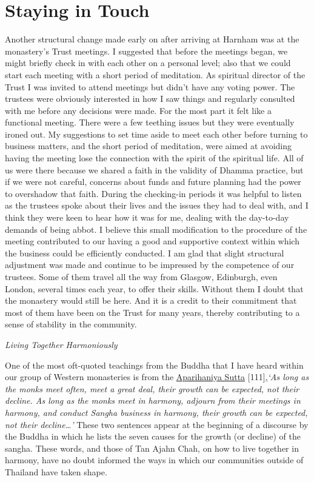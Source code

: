 \chapter{Staying in Touch}

Another structural change made early on after arriving at Harnham was at
the monastery's Trust meetings. I suggested that before the meetings
began, we might briefly check in with each other on a personal level;
also that we could start each meeting with a short period of meditation.
As spiritual director of the Trust I was invited to attend meetings but
didn't have any voting power. The trustees were obviously interested in
how I saw things and regularly consulted with me before any decisions
were made. For the most part it felt like a functional meeting. There
were a few teething issues but they were eventually ironed out. My
suggestions to set time aside to meet each other before turning to
business matters, and the short period of meditation, were aimed at
avoiding having the meeting lose the connection with the spirit of the
spiritual life. All of us were there because we shared a faith in the
validity of Dhamma practice, but if we were not careful, concerns about
funds and future planning had the power to overshadow that faith. During
the checking-in periods it was helpful to listen as the trustees spoke
about their lives and the issues they had to deal with, and I think they
were keen to hear how it was for me, dealing with the day-to-day demands
of being abbot. I believe this small modification to the procedure of
the meeting contributed to our having a good and supportive context
within which the business could be efficiently conducted. I am glad that
slight structural adjustment was made and continue to be impressed by
the competence of our trustees. Some of them travel all the way from
Glasgow, Edinburgh, even London, several times each year, to offer their
skills. Without them I doubt that the monastery would still be here. And
it is a credit to their commitment that most of them have been on the
Trust for many years, thereby contributing to a sense of stability in
the community.

\emph{Living Together Harmoniously}

One of the most oft-quoted teachings from the Buddha that I have heard
within our group of Western monasteries is from the
\href{https://www.dhammatalks.org/suttas/AN/AN7_21.html}{\underline{Aparihaniya
Sutta}} {[}111{]}\underline{,}\emph{`As long as the monks meet often,
meet a great deal, their growth can be expected, not their decline. As
long as the monks meet in harmony, adjourn from their meetings in
harmony, and conduct Sangha business in harmony, their growth can be
expected, not their decline\ldots'} These two sentences appear at the
beginning of a discourse by the Buddha in which he lists the seven
causes for the growth (or decline) of the sangha. These words, and those
of Tan Ajahn Chah, on how to live together in harmony, have no doubt
informed the ways in which our communities outside of Thailand have
taken shape.

